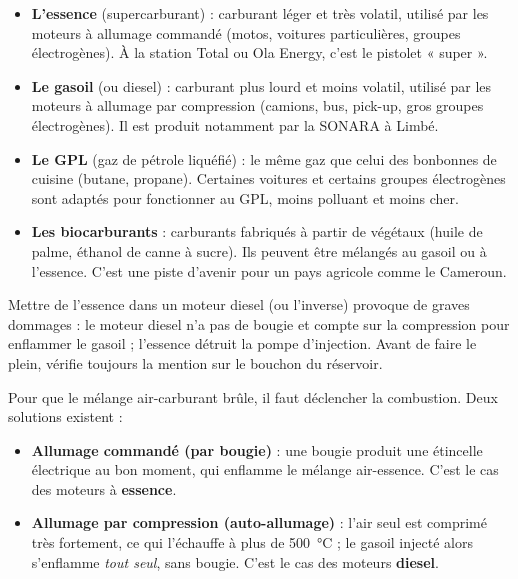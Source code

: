 \documentclass[11pt]{article}
\newcommand{\cle}[1]{{\popxbold\color{popdark}#1}}
\newcounter{popsec}
\newcounter{popsub}
\newcommand{\courssub}[1]{%
  \stepcounter{popsub}%
  \par\vspace{9pt}\noindent{\popxbold\fontsize{11.5}{13}\selectfont\color{popink}{\color{poporange}\thepopsec.\thepopsub}\hspace{6pt}#1}\par\nopagebreak\vspace{4pt}
}
\begin{document}
\begin{itemize}
\item \textbf{L'essence} (supercarburant) : carburant léger et très volatil, utilisé par les moteurs à allumage commandé (motos, voitures particulières, groupes électrogènes). À la station Total ou Ola Energy, c'est le pistolet « super ».
\item \textbf{Le gasoil} (ou diesel) : carburant plus lourd et moins volatil, utilisé par les moteurs à allumage par compression (camions, bus, pick-up, gros groupes électrogènes). Il est produit notamment par la SONARA à Limbé.
\item \textbf{Le GPL} (gaz de pétrole liquéfié) : le même gaz que celui des bonbonnes de cuisine (butane, propane). Certaines voitures et certains groupes électrogènes sont adaptés pour fonctionner au GPL, moins polluant et moins cher.
\item \textbf{Les biocarburants} : carburants fabriqués à partir de végétaux (huile de palme, éthanol de canne à sucre). Ils peuvent être mélangés au gasoil ou à l'essence. C'est une piste d'avenir pour un pays agricole comme le Cameroun.
\end{itemize}

\begin{attention}
Mettre de l'essence dans un moteur diesel (ou l'inverse) provoque de graves dommages : le moteur diesel n'a pas de bougie et compte sur la compression pour enflammer le gasoil ; l'essence détruit la pompe d'injection. Avant de faire le plein, vérifie toujours la mention sur le bouchon du réservoir.
\end{attention}

\courssub{Critère 3 : le mode d'allumage}

Pour que le mélange air-carburant brûle, il faut déclencher la combustion. Deux solutions existent :

\begin{itemize}
\item \textbf{Allumage commandé (par bougie)} : une \cle{bougie} produit une étincelle électrique au bon moment, qui enflamme le mélange air-essence. C'est le cas des moteurs à \textbf{essence}.
\item \textbf{Allumage par compression (auto-allumage)} : l'air seul est comprimé très fortement, ce qui l'échauffe à plus de \SI{500}{\celsius} ; le gasoil injecté alors s'enflamme \emph{tout seul}, sans bougie. C'est le cas des moteurs \textbf{diesel}.
\end{itemize}
\end{document}
